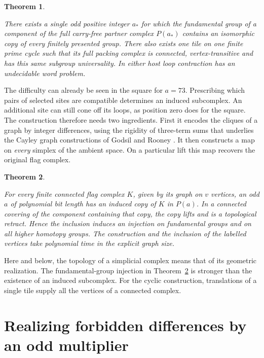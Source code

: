 \documentclass[11pt,letterpaper]{article}
\newtheorem{theorem}{Theorem}[section]
\numberwithin{equation}{section}
\begin{document}
\begin{theorem}\label{thm:universal}

There exists a single odd positive integer \(a_*\) for which the fundamental group of a
component of the full carry-free partner complex \(P(a_*)\) contains an isomorphic copy of
every finitely presented group. There also exists one tile on one finite prime cycle such that
its full packing complex is connected, vertex-transitive and has this same subgroup
universality. In either host loop contraction has an undecidable word problem.
\end{theorem}

The difficulty can already be seen in the square for $a=73$. Prescribing which pairs of
selected sites are compatible determines an induced subcomplex. An additional site can still
cone off its loops, as position zero does for the square. The construction therefore needs two
ingredients. First it encodes the cliques of a
graph by integer differences, using the rigidity of three-term sums that underlies the Cayley
graph constructions of Godsil and Rooney \cite{godsil}. It then constructs a map on
\emph{every} simplex of the ambient space. On a particular lift this map recovers the original
flag complex.

\begin{theorem}\label{thm:realize}

For every finite connected flag complex \(K\), given by its graph on \(v\) vertices, an odd
\(a\) of polynomial bit length has an induced copy of \(K\) in \(P(a)\). In a connected
covering of the component containing that copy, the copy lifts and is a topological retract.
Hence the inclusion induces an injection on fundamental groups and on all higher homotopy
groups. The construction and the inclusion of the labelled vertices take polynomial time in
the explicit graph size.
\end{theorem}

Here and below, the topology of a simplicial complex means that of its geometric realization.
The fundamental-group injection in Theorem~\ref{thm:realize} is stronger than the existence of
an induced subcomplex. For the cyclic construction, translations of a single tile supply all
the vertices of a connected complex.

\section{Realizing forbidden differences by an odd multiplier}\label{sec:dist}
\end{document}

